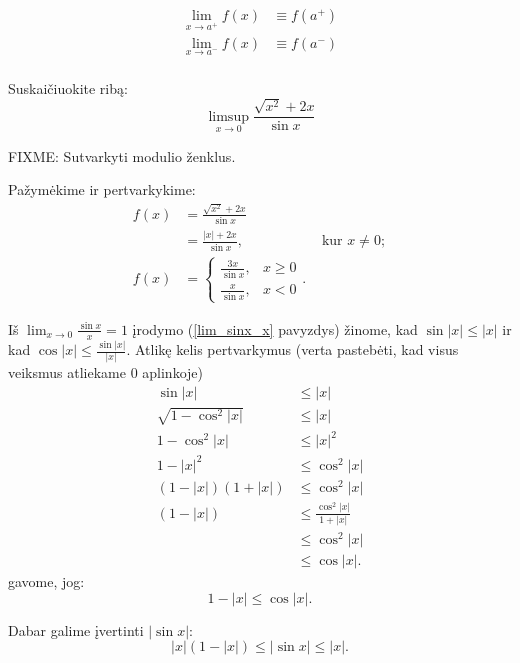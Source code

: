 \begin{notation}
  \begin{align*}
    \lim _{x \to a^{+}} f(x) &\equiv f(a^{+}) \\
    \lim _{x \to a^{-}} f(x) &\equiv f(a^{-}) \\
  \end{align*}
\end{notation}

\begin{exmp}
  Suskaičiuokite ribą:
  \begin{equation*}
    \limsup _{x \to 0} \frac{\sqrt{x^2} + 2x}{\sin x}
  \end{equation*}

  FIXME: Sutvarkyti modulio ženklus.

  Pažymėkime ir pertvarkykime:
  \begin{align*}
    f(x) 
    &= \frac{\sqrt{x^2} + 2x}{\sin x} \\
    &= \frac{|x| + 2x}{\sin x}, & \text{ kur } x \neq 0; \\
    f(x) 
    &=
    \begin{cases}
      \frac{3x}{\sin x}, & x \geq 0 \\
      \frac{x}{\sin x}, & x < 0
    \end{cases}.
  \end{align*}

  Iš $\lim _{x \to 0} \frac{\sin x}{x} = 1$ įrodymo 
  (\ref{lim_sinx_x} pavyzdys) žinome, kad $\sin |x| \leq |x|$ ir 
  kad $\cos |x| \leq \frac{\sin |x|}{|x|}$. Atlikę
  kelis pertvarkymus (verta pastebėti, kad visus veiksmus atliekame
  0 aplinkoje)
  \begin{align*}
    \sin |x| &\leq |x| \\
    \sqrt{1 - \cos ^{2} |x|} &\leq |x| \\
    1 - \cos^{2} |x| &\leq |x|^{2} \\
    1 - |x|^{2} &\leq \cos^{2} |x| \\
    (1 - |x|)(1 + |x|) &\leq \cos^{2} |x| \\
    (1 - |x|) &\leq \frac{\cos^{2} |x|}{1 + |x|} \\
      &\leq \cos^{2} |x| \\
      &\leq \cos |x|.
  \end{align*}
  gavome, jog:
  \begin{equation*}
    1 - |x| \leq \cos |x|.
  \end{equation*}

  Dabar galime įvertinti $|\sin x|$:
  \begin{equation*}
    |x|(1 - |x|) \leq |\sin x| \leq |x|.
  \end{equation*}


\end{exmp}
